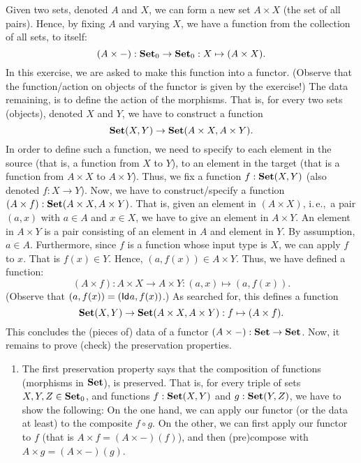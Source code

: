 \begin{solution}\label{sol:functor_prod_on_left}
	Given two sets, denoted $A$ and $X$, we can form a new set $A \times X$ (the set of all pairs).
	Hence, by fixing $A$ and varying $X$, we have a function from the collection of all sets, to itself:
	\[
		(A \times -) : {\mathbf{Set}}_0 \to {\mathbf{Set}}_0 : X \mapsto (A \times X).	
	\]
	In this exercise, we are asked to make this function into a functor.
	(Observe that the function/action on objects of the functor is given by the exercise!)
	The data remaining, is to define the action of the morphisms.
	That is, for every two sets (objects), denoted $X$ and $Y$, we have to construct a function
	\[
		{\mathbf{Set}}(X,Y) \to {\mathbf{Set}}(A \times X,A \times Y).
	\]
	In order to define such a function, we need to specify to each element in the source (that is, a function from $X$ to $Y$), to an element in the target (that is a function from $A \times X$ to $A \times Y$).
	Thus, we fix a function $f : {\mathbf{Set}}(X,Y)$ (also denoted $f : X \to Y$).
	Now, we have to construct/specify a function $(A \times f) : {\mathbf{Set}}(A \times X,A \times Y)$.
	That is, given an element in $(A \times X)$, i.\,e.,\, a pair $(a, x)$ with $a \in A$ and $x \in X$, we have to give an element in $A \times Y$.
	An element in $A \times Y$ is a pair consisting of an element in $A$ and element in $Y$.
	By assumption, $a \in A$. 
	Furthermore, since $f$ is a function whose input type is $X$, we can apply $f$ to $x$.
	That is $f(x) \in Y$.
	Hence, $(a, f(x)) \in A \times Y$.
	Thus, we have defined a function:
	\[
		(A \times f) : A \times X \to A \times Y : (a, x) \mapsto (a, f(x)).
	\]
	(Observe that $(a, f(x)) = (\mathsf{Id}_{}{a}, f(x))$.)
	As searched for, this defines a function
	\[
		{\mathbf{Set}}(X,Y) \to {\mathbf{Set}}(A \times X,A \times Y) : f \mapsto (A \times f).
	\]
	This concludes the (pieces of) data of a functor $(A \times -) : \mathbf{Set} \to \mathbf{Set}$.
	Now, it remains to prove (check) the preservation properties.
	\begin{enumerate}
		\item The first preservation property says that the composition of functions (morphisms in $\mathbf{Set}$), is preserved.
		That is, for every triple of sets $X, Y, Z \in {\mathbf{Set}}_0$, and functions $f : \mathbf{Set}(X, Y)$ and $g : \mathbf{Set}(Y, Z)$, we have to show the following:
		On the one hand, we can apply our functor (or the data at least) to the composite $f \circ g$.
		On the other, we can first apply our functor to $f$ (that is $A \times f = (A \times -)(f)$), and then (pre)compose with $A \times g = (A \times -)(g)$.

\end{enumerate}
\end{solution}
